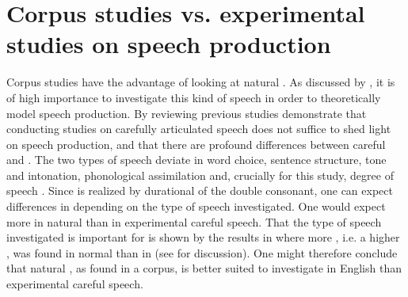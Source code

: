 \section{Corpus studies vs. experimental studies on speech production} \label{corpus and experimental studies}


Corpus studies have the advantage of looking at natural . As discussed by \cite{Tucker.2016}, it is of high importance to investigate this kind of speech in order to theoretically model speech production.  By reviewing previous studies \cite{Tucker.2016} demonstrate that conducting studies on carefully articulated speech does not suffice to shed light on speech production, and that there are profound differences between careful and . The two types of speech deviate in word choice, sentence structure, tone and intonation, phonological assimilation and, crucially for this study, degree of speech . Since  is realized by durational  of the double consonant, one can expect differences in  depending on the type of speech investigated. One would expect more  in natural  than in experimental careful speech. That the type of speech investigated is important for  is shown by the results in \cite{Oh.2012} where more , i.e. a higher , was found in normal than in  (see  for discussion). One might therefore conclude that natural , as found in a corpus, is better suited to investigate  in English than experimental careful speech.


